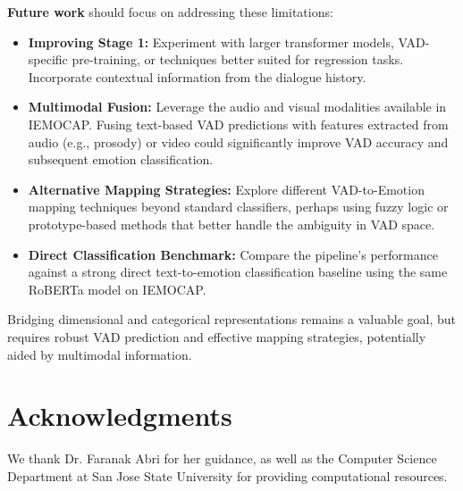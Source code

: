 \documentclass[conference]{IEEEtran}
\begin{document}
\textbf{Future work} should focus on addressing these limitations:
\begin{itemize}
    \item \textbf{Improving Stage 1:} Experiment with larger transformer models, VAD-specific pre-training, or techniques better suited for regression tasks. Incorporate contextual information from the dialogue history.
    \item \textbf{Multimodal Fusion:} Leverage the audio and visual modalities available in IEMOCAP. Fusing text-based VAD predictions with features extracted from audio (e.g., prosody) or video could significantly improve VAD accuracy and subsequent emotion classification.
    \item \textbf{Alternative Mapping Strategies:} Explore different VAD-to-Emotion mapping techniques beyond standard classifiers, perhaps using fuzzy logic or prototype-based methods that better handle the ambiguity in VAD space.
    \item \textbf{Direct Classification Benchmark:} Compare the pipeline's performance against a strong direct text-to-emotion classification baseline using the same RoBERTa model on IEMOCAP.
\end{itemize}

Bridging dimensional and categorical representations remains a valuable goal, but requires robust VAD prediction and effective mapping strategies, potentially aided by multimodal information.

\section*{Acknowledgments}
We thank Dr. Faranak Abri for her guidance, as well as the Computer Science Department at San Jose State University for providing computational resources.
\end{document}
